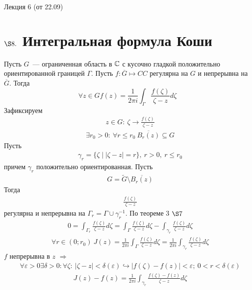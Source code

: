 \LARGE{Лекция 6 (от 22.09)}
\normalsize
\section{$\S 8.$ Интегральная формула Коши}
\theorem
Пусть $G$~--- ограниченная область в $\mathbb{C}$ с кусочно гладкой положительно
ориентированной границей $\Gamma$. Пусть $f: \overline{G} \mapsto CC$ регулярна
на $G$ и непрерывна на $\overline{G}$. Тогда
\begin{equation} \label{(8.1)}
    \forall z \in G f(z) = \frac{1}{2\pi i}\int_{\Gamma}\frac{f(\zeta)}{\zeta - z}d\zeta
\end{equation}
\pr
Зафиксируем
\begin{align*}
  & z \in G: \ \zeta \to \frac{f(\zeta)}{\zeta - z}
\end{align*}
\begin{align*}
  & \exists r_0 > 0: \ \forall r \leq r_0 \ \overline{B_r(z)} \subseteq G
\end{align*}
Пусть
\begin{align*}
  & \gamma_r = \{\zeta \mid \left| \zeta - z \right| = r\}, \ r > 0, \ r \leq r_0
\end{align*}
причем $\gamma_r$ положительно ориентированная. Пусть
\begin{align*}
  & G = \tilde{G} \setminus \overline{B_r(z)}
\end{align*}
Тогда
\begin{align*}
  & \frac{f(\zeta)}{\zeta - z}
\end{align*}
регулярна и непрерывна на $\Gamma_r = \Gamma \cup \gamma_r^{-1}$.
По теореме $3$ $\S 7$
\begin{align*}
  & 0 = \int_{\Gamma_r} \frac{f(\zeta)}{\zeta - z} d \zeta =  \int_{\Gamma} \frac{f(\zeta)}{\zeta - z} d \zeta - \int_{\gamma_r} \frac{f(\zeta)}{\zeta - z} d \zeta
\end{align*}
\begin{align*}
  & \forall r \in (0; r_0) \ J(z) = \frac{1}{2 \pi i} \int_{\Gamma} \frac{f(\zeta)}{\zeta - z} d \zeta = \frac{1}{2 \pi i} \int_{\gamma_r} \frac{f(\zeta)}{\zeta - z} d \zeta
\end{align*}
$f$ непрерывна в $z$ $\Rightarrow$
\begin{align*}
  & \forall \varepsilon > 0 \exists \delta > 0: \forall \zeta: \ \left| \zeta - z \right| < \delta(\varepsilon) \hookrightarrow \left| f(\zeta) - f(z) \right| < \varepsilon; \ 0 < r < \delta(\varepsilon)
\end{align*}
\begin{align*}
  & J(z) - f(z) = \frac{1}{2 \pi i} \int_{\gamma_r} \frac{f(\zeta) - f(z)}{\zeta - z} d \zeta
\end{align*}
